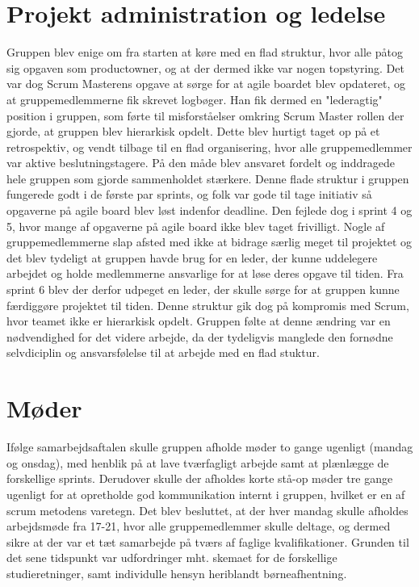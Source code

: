 \section{Projekt administration og ledelse}
Gruppen blev enige om fra starten at køre med en flad struktur, hvor alle påtog sig opgaven som productowner, og at der dermed ikke var nogen topstyring. Det var dog Scrum Masterens opgave at sørge for at agile boardet blev opdateret, og at gruppemedlemmerne fik skrevet logbøger. Han fik dermed en "lederagtig" position i gruppen, som førte til misforståelser omkring Scrum Master rollen der gjorde, at gruppen blev hierarkisk opdelt. Dette blev hurtigt taget op på et retrospektiv, og vendt tilbage til en flad organisering, hvor alle gruppemedlemmer var aktive beslutningstagere. På den måde blev ansvaret fordelt og inddragede hele gruppen som gjorde sammenholdet stærkere. Denne flade struktur i gruppen fungerede godt i de første par sprints, og folk var gode til tage initiativ så opgaverne på agile board blev løst indenfor deadline. Den fejlede dog i sprint 4 og 5, hvor mange af opgaverne på agile board ikke blev taget frivilligt. Nogle af gruppemedlemmerne slap afsted med ikke at bidrage særlig meget til projektet og det blev tydeligt at gruppen havde brug for en leder, der kunne uddelegere arbejdet og holde medlemmerne ansvarlige for at løse deres opgave til tiden. Fra sprint 6 blev der derfor udpeget en leder, der skulle sørge for at gruppen kunne færdiggøre projektet til tiden. Denne struktur gik dog på kompromis med Scrum, hvor teamet ikke er hierarkisk opdelt. Gruppen følte at denne ændring var en nødvendighed for det videre arbejde, da der tydeligvis manglede den fornødne selvdiciplin og ansvarsfølelse til at arbejde med en flad stuktur.

\section{Møder}
Ifølge samarbejdsaftalen skulle gruppen afholde møder to gange ugenligt (mandag og onsdag), med henblik på at lave tværfagligt arbejde samt at plænlægge
de forskellige sprints. Derudover skulle der afholdes korte stå-op møder tre gange ugenligt for at opretholde god kommunikation internt i gruppen,
hvilket er en af scrum metodens varetegn.
Det blev besluttet, at der hver mandag skulle afholdes arbejdsmøde fra 17-21, hvor alle gruppemedlemmer skulle deltage, og dermed sikre at der var
et tæt samarbejde på tværs af faglige kvalifikationer. Grunden til det sene tidspunkt var udfordringer mht. skemaet for de forskellige studieretninger,
samt individulle hensyn heriblandt børneafhentning. 

